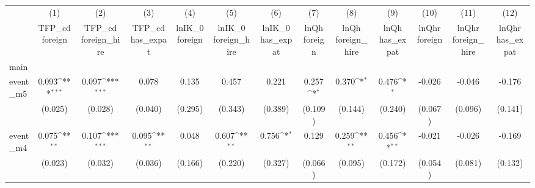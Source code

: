 {
\def\sym#1{\ifmmode^{#1}\else\(^{#1}\)\fi}
\begin{tabular}{l*{12}{c}}
\hline\hline
            &\multicolumn{1}{c}{(1)}&\multicolumn{1}{c}{(2)}&\multicolumn{1}{c}{(3)}&\multicolumn{1}{c}{(4)}&\multicolumn{1}{c}{(5)}&\multicolumn{1}{c}{(6)}&\multicolumn{1}{c}{(7)}&\multicolumn{1}{c}{(8)}&\multicolumn{1}{c}{(9)}&\multicolumn{1}{c}{(10)}&\multicolumn{1}{c}{(11)}&\multicolumn{1}{c}{(12)}\\
            &\multicolumn{1}{c}{TFP\_cd  foreign}&\multicolumn{1}{c}{TFP\_cd  foreign\_hire}&\multicolumn{1}{c}{TFP\_cd  has\_expat}&\multicolumn{1}{c}{lnIK\_0  foreign}&\multicolumn{1}{c}{lnIK\_0  foreign\_hire}&\multicolumn{1}{c}{lnIK\_0  has\_expat}&\multicolumn{1}{c}{lnQh  foreign}&\multicolumn{1}{c}{lnQh  foreign\_hire}&\multicolumn{1}{c}{lnQh  has\_expat}&\multicolumn{1}{c}{lnQhr  foreign}&\multicolumn{1}{c}{lnQhr  foreign\_hire}&\multicolumn{1}{c}{lnQhr  has\_expat}\\
\hline
main        &                     &                     &                     &                     &                     &                     &                     &                     &                     &                     &                     &                     \\
event\_m5    &       0.093\sym{***}&       0.097\sym{***}&       0.078         &       0.135         &       0.457         &       0.221         &       0.257\sym{*}  &       0.370\sym{*}  &       0.476\sym{*}  &      -0.026         &      -0.046         &      -0.176         \\
            &     (0.025)         &     (0.028)         &     (0.040)         &     (0.295)         &     (0.343)         &     (0.389)         &     (0.109)         &     (0.144)         &     (0.240)         &     (0.067)         &     (0.096)         &     (0.141)         \\
[1em]
event\_m4    &       0.075\sym{**} &       0.107\sym{***}&       0.095\sym{**} &       0.048         &       0.607\sym{**} &       0.756\sym{*}  &       0.129         &       0.259\sym{**} &       0.456\sym{**} &      -0.021         &      -0.026         &      -0.169         \\
            &     (0.023)         &     (0.032)         &     (0.036)         &     (0.166)         &     (0.220)         &     (0.327)         &     (0.066)         &     (0.095)         &     (0.172)         &     (0.054)         &     (0.081)         &     (0.132)         \\

\end{tabular}}
